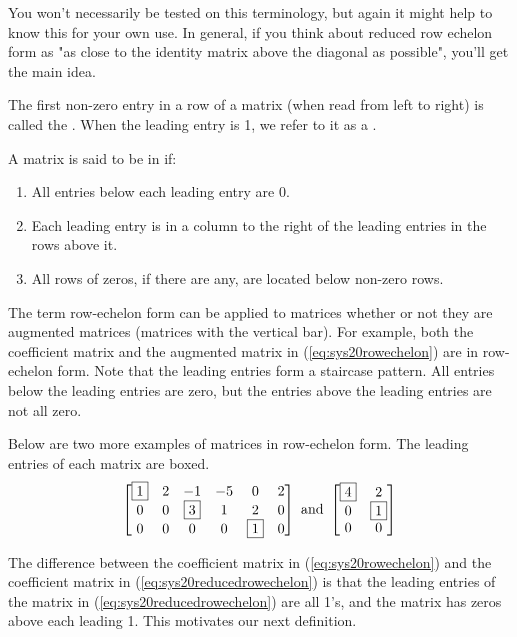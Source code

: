 \documentclass{ximera}
\begin{document}
You won't necessarily be tested on this terminology, but again it might help to know this for your own use. In general, if you think about reduced row echelon form as "as close to the identity matrix above the diagonal as possible", you'll get the main idea.


 
\begin{definition}\label{def:leadentry} The first non-zero entry in a row of a matrix (when read from left to right) is called the .  When the leading entry is 1, we refer to it as a .
\end{definition}


 
\begin{definition}\label{def:ref}
A matrix is said to be in  if:
\begin{enumerate}
\item All entries below each leading entry are 0.
\item Each leading entry is in a column to the right of the leading entries in the rows above it.
\item All rows of zeros, if there are any, are located below non-zero rows.
\end{enumerate}
\end{definition}
 
The term row-echelon form can be applied to matrices whether or not they are augmented matrices (matrices with the vertical bar). For example, both the coefficient matrix and the augmented matrix in (\ref{eq:sys20rowechelon}) are in row-echelon form.  Note that the leading entries form a staircase pattern. All entries below the leading entries are zero, but the entries above the leading entries are not all zero.
 
Below are two more examples of matrices in row-echelon form.  The leading entries of each matrix are boxed.
$$\begin{bmatrix}
 \fbox{1}&2&-1&-5&0&2\\0&0&\fbox{3}&1&2&0\\0&0&0&0&\fbox{1}&0
 \end{bmatrix}\quad\text{and}\quad\begin{bmatrix}
 \fbox{4}&2\\0&\fbox{1}\\0&0
 \end{bmatrix}$$
  

The difference between the coefficient matrix in  (\ref{eq:sys20rowechelon}) and the coefficient matrix in (\ref{eq:sys20reducedrowechelon}) is that the leading entries of the  matrix in (\ref{eq:sys20reducedrowechelon}) are all 1's, and the matrix has zeros above each leading 1.  This motivates our next definition.
 
\end{document}
